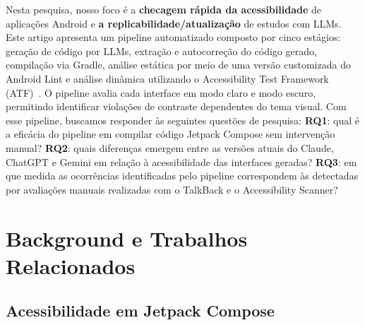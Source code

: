 \documentclass[sigconf,anonymous,review]{webmedia}
\begin{document}
Nesta pesquisa, nosso foco é a \textbf{checagem rápida da
acessibilidade} de aplicações Android e \textbf{a
replicabilidade/atualização} de estudos com LLMs. Este artigo
apresenta um pipeline automatizado composto por cinco estágios:
geração de código por LLMs, extração e autocorreção do código
gerado, compilação via Gradle, análise estática por meio de uma
versão customizada do Android Lint e análise dinâmica utilizando
o Accessibility Test Framework (ATF)~\cite{google2024atf}. O
pipeline avalia cada interface em modo claro e modo escuro,
permitindo identificar violações de contraste dependentes do tema
visual. Com esse pipeline, buscamos responder às seguintes
questões de pesquisa: \textbf{RQ1}: qual é a eficácia do pipeline
em compilar código Jetpack Compose sem intervenção manual?
\textbf{RQ2}: quais diferenças emergem entre as versões atuais
do Claude, ChatGPT e Gemini em relação à acessibilidade das
interfaces geradas? \textbf{RQ3}: em que medida as ocorrências
identificadas pelo pipeline correspondem às detectadas por
avaliações manuais realizadas com o TalkBack e o Accessibility
Scanner?
\section{Background e Trabalhos Relacionados}
\label{sec:background}

\subsection{Acessibilidade em Jetpack Compose}
\end{document}
